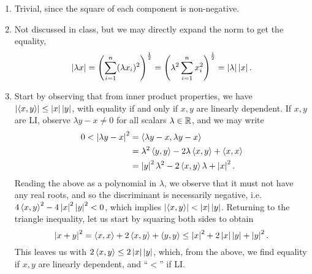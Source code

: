 \begin{enumerate}[label=(\alph*)]
    \item Trivial, since the square of each component is non-negative.
    \item Not discussed in class, but we may directly expand the norm to get the equality,
    \[ \left\lvert \lambda x \right\rvert = \left( \sum_{i=1}^n (\lambda x_i)^2 \right)^{\frac{1}{2}} = \left( \lambda^2 \sum_{i=1}^n x_i^2 \right)^{\frac{1}{2}} = \left\lvert \lambda \right\rvert \left\lvert x \right\rvert. \]
    \item Start by observing that from inner product properties, we have $\left\lvert \left<x, y\right> \right\rvert \leq \left\lvert x \right\rvert \left\lvert y \right\rvert$, with equality if and only if $x, y$ are linearly dependent. If $x, y$ are LI, observe $\lambda y - x \neq 0$ for all scalars $\lambda \in \mathbb R$, and we may write
    \begin{align*}
        0 < \left\lvert \lambda y - x \right\rvert^2 &= \left<\lambda y - x, \lambda y - x\right> \\
        &= \lambda^2 \left<y, y\right> - 2\lambda \left<x, y\right> + \left<x, x\right> \\
        &= \left\lvert y \right\rvert^2 \lambda^2 - 2 \left<x, y\right> \lambda + \left\lvert x \right\rvert^2.
    \end{align*}
    Reading the above as a polynomial in $\lambda$, we observe that it must not have any real roots, and so the discriminant is necessarily negative, i.e. $4 \left<x, y\right>^2 - 4\left\lvert x \right\rvert^2\left\lvert y \right\rvert^2 < 0$, which implies $\left\lvert \left<x, y\right> \right\rvert < \left\lvert x \right\rvert \left\lvert y \right\rvert$. Returning to the triangle inequality, let us start by squaring both sides to obtain
    \[ \left\lvert x + y \right\rvert^2 = \left<x, x\right> + 2\left<x, y\right> + \left<y, y\right> \leq \left\lvert x \right\rvert^2 + 2\left\lvert x \right\rvert\left\lvert y \right\rvert + \left\lvert y \right\rvert^2. \]
    This leaves us with $2 \left<x, y\right> \leq 2\left\lvert x \right\rvert\left\lvert y \right\rvert$, which, from the above, we find equality if $x, y$ are linearly dependent, and ``$<$'' if LI.
\end{enumerate}

